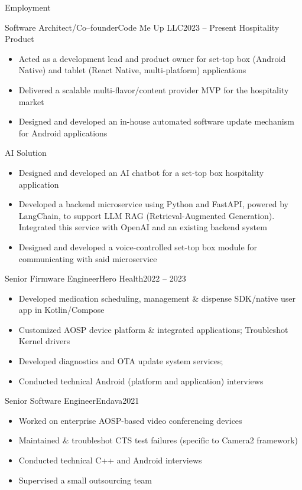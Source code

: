 \documentclass[]{mcdowellcv}
\begin{document}
\begin{cvsection}{Employment}
\begin{cvsubsection}{Software Architect/Co--founder}{Code Me Up LLC}{2023 -- Present}
			Hospitality Product
			\begin{itemize}
				\item Acted as a development lead and product owner for set-top box (Android Native) and tablet (React Native, multi-platform) applications
				\item Delivered a scalable multi-flavor/content provider MVP for the hospitality market
				\item Designed and developed an in-house automated software update mechanism for Android applications \newline
			\end{itemize}

			AI Solution
			\begin{itemize}
				\item Designed and developed an AI chatbot for a set-top box hospitality application
				\item Developed a backend microservice using Python and FastAPI, powered by LangChain, to support LLM RAG (Retrieval-Augmented Generation). Integrated this service with OpenAI and an existing backend system
				\item Designed and developed a voice-controlled set-top box module for communicating with said microservice
			\end{itemize}
			
		\end{cvsubsection}

		\begin{cvsubsection}{Senior Firmware Engineer}{Hero Health}{2022 -- 2023}
			\begin{itemize}
				\item Developed medication scheduling, management \& dispense SDK/native user app in Kotlin/Compose
				\item Customized AOSP device platform \& integrated applications; Troubleshot Kernel drivers
				\item Developed diagnostics and OTA update system services;
				\item Conducted technical Android (platform and application) interviews
			\end{itemize}
		\end{cvsubsection}

		\begin{cvsubsection}{Senior Software Engineer}{Endava}{2021}
			\begin{itemize}
				\item Worked on enterprise AOSP-based video conferencing devices
				\item Maintained \& troubleshot CTS test failures (specific to Camera2 framework)
				\item Conducted technical C++ and Android interviews
				\item Supervised a small outsourcing team
			\end{itemize}
		\end{cvsubsection}


\end{cvsection}
\end{document}

